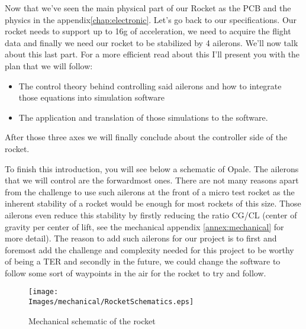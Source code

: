 Now that we've seen the main physical part of our Rocket as the PCB and the
physics in the appendix\ref{chap:electronic}. Let's go back to our specifications. Our rocket needs
to support up to 16g of acceleration, we need to acquire the flight data and
finally we need our rocket to be stabilized by 4 ailerons. We'll now talk about
this last part. For a more efficient read about this I'll present you with the
plan that we will follow:

\begin{itemize}
    \item The control theory behind controlling said ailerons and how to integrate those
          equations into simulation software
    \item The application and translation of those simulations to the software.
\end{itemize}

After those three axes we will finally conclude about the controller side of
the rocket.

To finish this introduction, you will see below a schematic of Opale. The
ailerons that we will control are the forwardmost ones. There are not many
reasons apart from the challenge to use such ailerons at the front of a micro
test rocket as the inherent stability of a rocket would be enough for most
rockets of this size. Those ailerons even reduce this stability by firstly
reducing the ratio CG/CL (center of gravity per center of lift, see the
mechanical appendix \ref{annex:mechanical} for more detail). The reason to add such ailerons for our
project is to first and foremost add the challenge and complexity needed for
this project to be worthy of being a TER and secondly in the future, we could
change the software to follow some sort of waypoints in the air for the rocket
to try and follow.

\begin{figure}[!hbt]
    \centering
    \texttt{[image: \\Images/mechanical/RocketSchematics.eps]}
    \caption{Mechanical schematic of the rocket}
\end{figure}
\FloatBarrier





